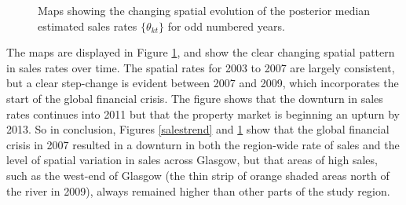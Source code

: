 \documentclass[article, nojss]{jss}
\begin{document}
\begin{figure}
\centering 
{}
\caption{Maps showing the changing spatial evolution of the posterior median estimated sales rates $\{\theta_{kt}\}$ for odd numbered years.\label{salesspatial}}
\end{figure} 

The maps are displayed in Figure \ref{salesspatial}, and show the clear changing spatial pattern in sales rates over time. The spatial rates for 2003 to 2007 are largely consistent, but a clear step-change is evident between 2007 and 2009, which incorporates the start of the global financial crisis. The figure shows that the downturn in sales rates continues into 2011 but that the property market is beginning an upturn by 2013. So in conclusion, Figures \ref{salestrend} and \ref{salesspatial} show that the global financial crisis in 2007 resulted in a downturn in both the region-wide rate of sales and the level of spatial variation in sales across Glasgow, but that areas of high sales, such as the west-end of Glasgow (the thin strip of orange shaded areas  north of the river in 2009), always remained higher than other parts of the study region. 





\end{document}
